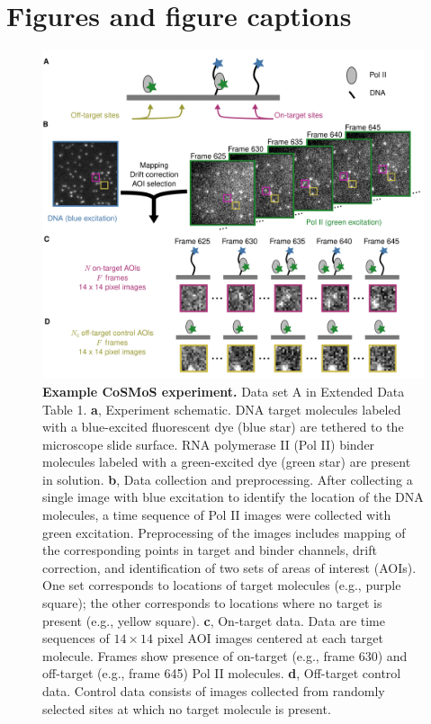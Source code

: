 \clearpage
\newpage
\section*{Figures and figure captions}
\pagebreak


\begin{figure}[h]
\centering
\includegraphics[width=145mm]{figures/figure1/figure1.png}
\caption{\textbf{Example CoSMoS experiment.} Data set A in Extended Data Table 1. \textbf{a}, Experiment schematic. DNA target molecules labeled with a blue-excited fluorescent dye (blue star) are tethered to the microscope slide surface. RNA polymerase II (Pol II) binder molecules labeled with a green-excited dye (green star) are present in solution. \textbf{b}, Data collection and preprocessing. After collecting a single image with blue excitation to identify the location of the DNA molecules, a time sequence of Pol II images were collected with green excitation.  Preprocessing of the images includes mapping of the corresponding points in target and binder channels, drift correction, and identification of two sets of areas of interest (AOIs).  One set corresponds to locations of target molecules (e.g., purple square); the other corresponds to locations where no target is present (e.g., yellow square). \textbf{c}, On-target data. Data are time sequences of $14 \times 14$ pixel AOI images centered at each target molecule. Frames show presence of on-target (e.g., frame 630) and off-target (e.g., frame 645) Pol II molecules. \textbf{d}, Off-target control data. Control data consists of images collected from randomly selected sites at which no target molecule is present. }
\label{fig:cosmos_experiment}
\end{figure}

